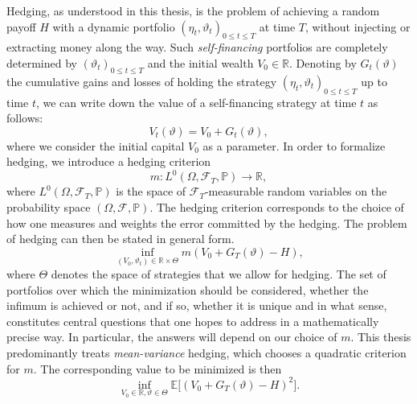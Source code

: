 \documentclass[11pt,a4paper,twoside,openany]{report}
\numberwithin{equation}{section}
\theoremstyle{plain} %
\theoremstyle{definition} %
\theoremstyle{remark} %
\begin{document}
Hedging, as understood in this thesis, is the problem of achieving a random payoff \(H\) with a dynamic portfolio  \((\eta_t,\vartheta_t)_{0\leq t\leq T}\) at time \(T\), without injecting or extracting money along the way. Such \textit{self-financing} portfolios are completely determined by \((\vartheta_t)_{0\leq t\leq T}\) and the initial wealth \(V_0\in\mathbb{R}\). Denoting by \(G_t(\vartheta)\) the cumulative gains and losses of holding the strategy \((\eta_t,\vartheta_t)_{0\leq t\leq T}\)  up to time \(t\), we can write down the value of a self-financing strategy at time \(t\) as follows:
\begin{equation}\label{eq:value process}
    V_t(\vartheta)=V_0+G_t(\vartheta),
\end{equation}
where we consider the initial capital \(V_0\) as a parameter.
In order to formalize hedging, we introduce a hedging criterion 
\begin{equation*}
    m:L^0(\Omega,\mathcal{F}_T,\mathbb{P})\to\mathbb{R},
\end{equation*}
where \(L^0(\Omega,\mathcal{F}_T,\mathbb{P})\) is the space of \(\mathcal{F}_T\)-measurable random variables on the probability space \((\Omega,\mathcal{F},\mathbb{P})\). The hedging criterion corresponds to the choice of how one measures and weights the error committed by the hedging.
The problem of hedging can then be stated in general form.
\begin{equation}\label{eq:first notion of heding}
    \inf_{(V_0,\vartheta_t)\in\mathbb{R}\times\Theta}m(V_0+G_{T}(\vartheta)-H),
\end{equation}
where \(\Theta\) denotes the space of strategies that we allow for hedging. The
 set of portfolios over which the minimization should be considered, whether the infimum is achieved or not, and if so, whether it is unique and in what sense, constitutes central questions that one hopes to address in a mathematically precise way. In particular, the answers will depend on our choice of \(m\). This thesis predominantly treats \textit{mean-variance} hedging, which chooses a quadratic criterion for \(m\). The corresponding value to be minimized is then
\begin{equation}
    \label{eq:introduction-mean-variance-problem}
    \inf_{V_0\in\mathbb{R},\vartheta\in\Theta}\mathbb{E}\Big[
        (V_0 + G_T(\vartheta)-H)^2
    \Big].
\end{equation}
\end{document}
